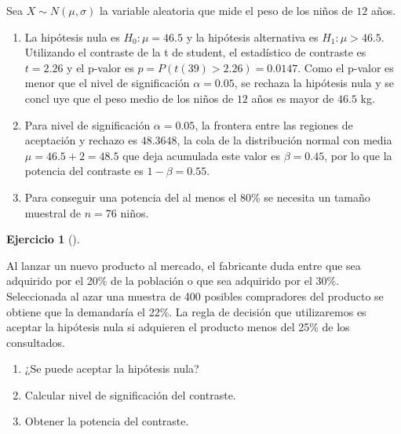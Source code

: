 \documentclass[
  spanish,
  a4paper,
]{scrreport}
\theoremstyle{definition}
\newtheorem{exercise}{Ejercicio}[chapter]
\theoremstyle{remark}
\begin{document}
\begin{tcolorbox}[enhanced jigsaw, arc=.35mm, bottomrule=.15mm, bottomtitle=1mm, breakable, colback=white, colbacktitle=quarto-callout-tip-color!10!white, colframe=quarto-callout-tip-color-frame, coltitle=black, left=2mm, leftrule=.75mm, opacityback=0, opacitybacktitle=0.6, rightrule=.15mm, title=\textcolor{quarto-callout-tip-color}{\faLightbulb}\hspace{0.5em}{Solución}, titlerule=0mm, toprule=.15mm, toptitle=1mm]

Sea \(X\sim N(\mu,\sigma)\) la variable aleatoria que mide el peso de
los niños de \(12\) años.

\begin{enumerate}
\def\labelenumi{\alph{enumi}.}
\item
  La hipótesis nula es \(H_0: \mu=46.5\) y la hipótesis alternativa es
  \(H_1: \mu> 46.5\). Utilizando el contraste de la t de student, el
  estadístico de contraste es \(t=2.26\) y el p-valor es
  \(p = P(t(39)>2.26) = 0.0147\). Como el p-valor es menor que el nivel
  de significación \(\alpha = 0.05\), se rechaza la hipótesis nula y se
  concl uye que el peso medio de los niños de \(12\) años es mayor de
  \(46.5\) kg.
\item
  Para nivel de significación \(\alpha=0.05\), la frontera entre las
  regiones de aceptación y rechazo es \(48.3648\), la cola de la
  distribución normal con media \(\mu=46.5+2=48.5\) que deja acumulada
  este valor es \(\beta=0.45\), por lo que la potencia del contraste es
  \(1-\beta=0.55\).
\item
  Para conseguir una potencia del al menos el \(80\)\% se necesita un
  tamaño muestral de \(n=76\) niños.
\end{enumerate}

\end{tcolorbox}

\begin{exercise}[]\protect\hypertarget{exr-contraste-proporcion-consumo-producto}{}\label{exr-contraste-proporcion-consumo-producto}

Al lanzar un nuevo producto al mercado, el fabricante duda entre que sea
adquirido por el 20\% de la población o que sea adquirido por el 30\%.
Seleccionada al azar una muestra de 400 posibles compradores del
producto se obtiene que la demandaría el 22\%. La regla de decisión que
utilizaremos es aceptar la hipótesis nula si adquieren el producto menos
del 25\% de los consultados.

\begin{enumerate}
\def\labelenumi{\alph{enumi}.}
\item
  ¿Se puede aceptar la hipótesis nula?
\item
  Calcular nivel de significación del contraste.
\item
  Obtener la potencia del contraste.
\end{enumerate}

\end{exercise}
\end{document}
